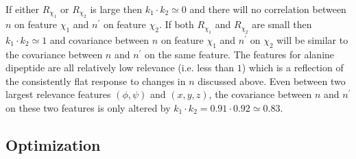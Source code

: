 If either $R_{\chi_1}$ or $R_{\chi_2}$ is large then $k_1 \cdot k_2 \simeq 0$ and there will no correlation between $n$ on feature $\chi_1$ and $n^{\prime}$ on feature $\chi_2$. If both $R_{\chi_1}$ and $R_{\chi_2}$ are small then $k_1 \cdot k_2 \simeq 1$ and covariance between $n$ on feature $\chi_1$ and $n^{\prime}$ on $\chi_2$ will be similar to the covariance between $n$ and $n^{\prime}$ on the same feature.  The features for alanine dipeptide are all relatively low relevance (i.e. less than $1$) which is a reflection of the  consistently flat response to changes in $n$ discussed above. Even between  two largest relevance features $(\phi, \psi)$ and $(x,y,z)$, the covariance between $n$ and $n^{\prime}$ on these two features is only altered by  $k_{1}\cdot k_{2} = 0.91\cdot0.92 \simeq 0.83$. 


\subsection{Optimization}\label{sec:ala_opt}

